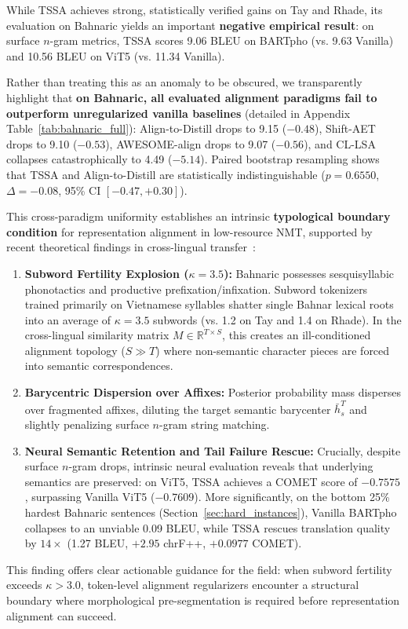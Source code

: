 \documentclass[11pt]{article}
\begin{document}
While TSSA achieves strong, statistically verified gains on Tay and Rhade, its evaluation on Bahnaric yields an important \textbf{negative empirical result}: on surface $n$-gram metrics, TSSA scores 9.06 BLEU on BARTpho (vs. 9.63 Vanilla) and 10.56 BLEU on ViT5 (vs. 11.34 Vanilla). 

Rather than treating this as an anomaly to be obscured, we transparently highlight that \textbf{on Bahnaric, all evaluated alignment paradigms fail to outperform unregularized vanilla baselines} (detailed in Appendix Table~\ref{tab:bahnaric_full}): Align-to-Distill drops to 9.15 ($-0.48$), Shift-AET drops to 9.10 ($-0.53$), AWESOME-align drops to 9.07 ($-0.56$), and CL-LSA collapses catastrophically to 4.49 ($-5.14$). Paired bootstrap resampling shows that TSSA and Align-to-Distill are statistically indistinguishable ($p = 0.6550$, $\Delta = -0.08$, 95\% CI $[-0.47, +0.30]$).

This cross-paradigm uniformity establishes an intrinsic \textbf{typological boundary condition} for representation alignment in low-resource NMT, supported by recent theoretical findings in cross-lingual transfer~\cite{ai2024zero,hu2024dm}:
\begin{enumerate}[leftmargin=*]
    \item \textbf{Subword Fertility Explosion ($\kappa = 3.5$):} Bahnaric possesses sesquisyllabic phonotactics and productive prefixation/infixation. Subword tokenizers trained primarily on Vietnamese syllables shatter single Bahnar lexical roots into an average of $\kappa = 3.5$ subwords (vs. 1.2 on Tay and 1.4 on Rhade). In the cross-lingual similarity matrix $M \in \mathbb{R}^{T \times S}$, this creates an ill-conditioned alignment topology ($S \gg T$) where non-semantic character pieces are forced into semantic correspondences.
    \item \textbf{Barycentric Dispersion over Affixes:} Posterior probability mass disperses over fragmented affixes, diluting the target semantic barycenter $\bar{h}_s^T$ and slightly penalizing surface $n$-gram string matching.
    \item \textbf{Neural Semantic Retention and Tail Failure Rescue:} Crucially, despite surface $n$-gram drops, intrinsic neural evaluation reveals that underlying semantics are preserved: on ViT5, TSSA achieves a COMET score of \textbf{$-0.7575$}, surpassing Vanilla ViT5 ($-0.7609$). More significantly, on the bottom 25\% hardest Bahnaric sentences (Section~\ref{sec:hard_instances}), Vanilla BARTpho collapses to an unviable 0.09 BLEU, while TSSA rescues translation quality by \textbf{$14\times$} (1.27 BLEU, $+2.95$ chrF++, $+0.0977$ COMET).
\end{enumerate}
This finding offers clear actionable guidance for the field: when subword fertility exceeds $\kappa > 3.0$, token-level alignment regularizers encounter a structural boundary where morphological pre-segmentation is required before representation alignment can succeed.
\end{document}
